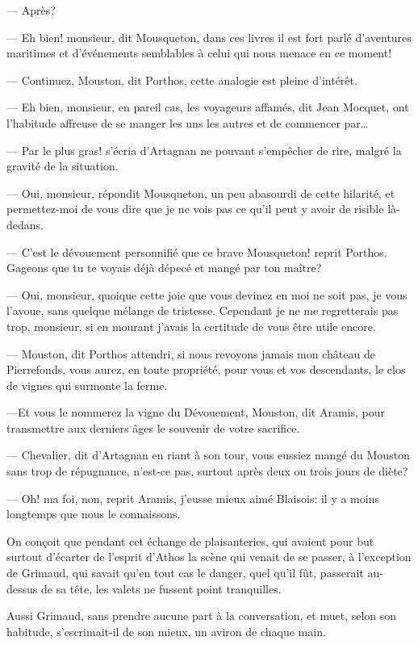 — Après?

— Eh bien! monsieur, dit Mousqueton, dans ces livres il est fort parlé d'aventures maritimes et d'événements semblables à celui qui nous menace en ce moment!

— Continuez, Mouston, dit Porthos, cette analogie est pleine d'intérêt.

— Eh bien, monsieur, en pareil cas, les voyageurs affamés, dit Jean Mocquet, ont l'habitude affreuse de se manger les uns les autres et de commencer par\dots

— Par le plus gras! s'écria d'Artagnan ne pouvant s'empêcher de rire, malgré la gravité de la situation.

— Oui, monsieur, répondit Mousqueton, un peu abasourdi de cette hilarité, et permettez-moi de vous dire que je ne vois pas ce qu'il peut y avoir de risible là-dedans.

— C'est le dévouement personnifié que ce brave Mousqueton! reprit Porthos. Gageons que tu te voyais déjà dépecé et mangé par ton maître?

— Oui, monsieur, quoique cette joie que vous devinez en moi ne soit pas, je vous l'avoue, sans quelque mélange de tristesse. Cependant je ne me regretterais pas trop, monsieur, si en mourant j'avais la certitude de vous être utile encore.

— Mouston, dit Porthos attendri, si nous revoyons jamais mon château de Pierrefonds, vous aurez, en toute propriété, pour vous et vos descendants, le clos de vignes qui surmonte la ferme.

—Et vous le nommerez la vigne du Dévouement, Mouston, dit Aramis, pour transmettre aux derniers âges le souvenir de votre sacrifice.

— Chevalier, dit d'Artagnan en riant à son tour, vous eussiez mangé du Mouston sans trop de répugnance, n'est-ce pas, surtout après deux ou trois jours de diète?

— Oh! ma foi, non, reprit Aramis, j'eusse mieux aimé Blaisois: il y a moins longtemps que nous le connaissons.

On conçoit que pendant cet échange de plaisanteries, qui avaient pour but surtout d'écarter de l'esprit d'Athos la scène qui venait de se passer, à l'exception de Grimaud, qui savait qu'en tout cas le danger, quel qu'il fût, passerait au-dessus de sa tête, les valets ne fussent point tranquilles.

Aussi Grimaud, sans prendre aucune part à la conversation, et muet, selon son habitude, s'escrimait-il de son mieux, un aviron de chaque main.

